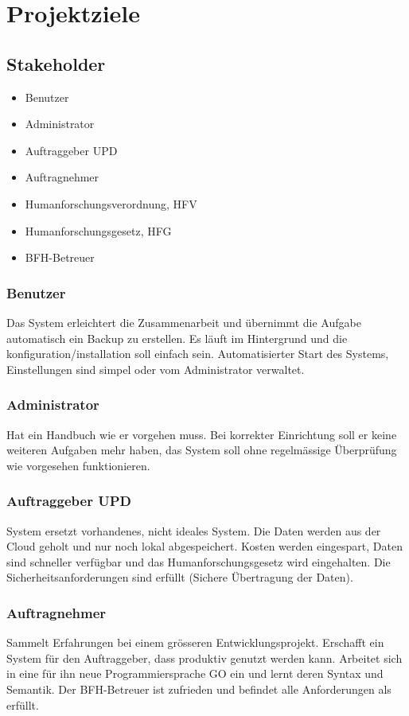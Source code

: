 \chapter{Projektziele}

\section{Stakeholder}
\begin{itemize}
\item Benutzer
\item Administrator
\item Auftraggeber UPD
\item Auftragnehmer
\item Humanforschungsverordnung, HFV
\item Humanforschungsgesetz, HFG
\item BFH-Betreuer
\end{itemize}

\subsection{Benutzer}
Das System erleichtert die Zusammenarbeit und übernimmt die Aufgabe automatisch ein Backup zu erstellen. Es läuft im Hintergrund und die konfiguration/installation soll einfach sein. Automatisierter Start des Systems, Einstellungen sind simpel oder vom Administrator verwaltet.

\subsection{Administrator}
Hat ein Handbuch wie er vorgehen muss. Bei korrekter Einrichtung soll er keine weiteren Aufgaben mehr haben, das System soll ohne regelmässige Überprüfung wie vorgesehen funktionieren.

\subsection{Auftraggeber UPD}
System ersetzt vorhandenes, nicht ideales System. Die Daten werden aus der Cloud geholt und nur noch lokal abgespeichert. Kosten werden eingespart, Daten sind schneller verfügbar und das Humanforschungsgesetz wird eingehalten. Die Sicherheitsanforderungen sind erfüllt (Sichere Übertragung der Daten).

\subsection{Auftragnehmer}
Sammelt Erfahrungen bei einem grösseren Entwicklungsprojekt. Erschafft ein System für den Auftraggeber, dass produktiv genutzt werden kann. Arbeitet sich in eine für ihn neue Programmiersprache GO ein und lernt deren Syntax und Semantik.
Der BFH-Betreuer ist zufrieden und befindet alle Anforderungen als erfüllt.

